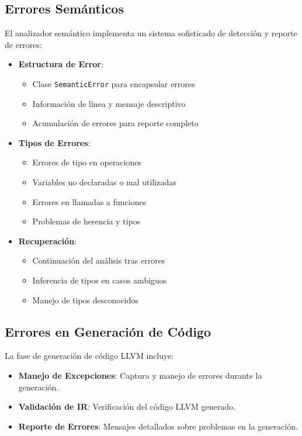 \documentclass[11pt, a4paper, twoside]{article} %
\begin{document}
\subsection{Errores Semánticos}

El analizador semántico implementa un sistema sofisticado de detección y reporte de errores:

\begin{itemize}
    \item \textbf{Estructura de Error}:
    \begin{itemize}
        \item Clase \texttt{SemanticError} para encapsular errores
        \item Información de línea y mensaje descriptivo
        \item Acumulación de errores para reporte completo
    \end{itemize}

    \item \textbf{Tipos de Errores}:
    \begin{itemize}
        \item Errores de tipo en operaciones
        \item Variables no declaradas o mal utilizadas
        \item Errores en llamadas a funciones
        \item Problemas de herencia y tipos
    \end{itemize}

    \item \textbf{Recuperaci\'on}:
    \begin{itemize}
        \item Continuación del análisis tras errores
        \item Inferencia de tipos en casos ambiguos
        \item Manejo de tipos desconocidos
    \end{itemize}
\end{itemize}


\subsection{Errores en Generación de Código}

La fase de generación de código LLVM incluye:

\begin{itemize}
    \item \textbf{Manejo de Excepciones}: Captura y manejo de errores durante la generación.
    \item \textbf{Validación de IR}: Verificación del código LLVM generado.
    \item \textbf{Reporte de Errores}: Mensajes detallados sobre problemas en la generación.
\end{itemize}
\end{document}

